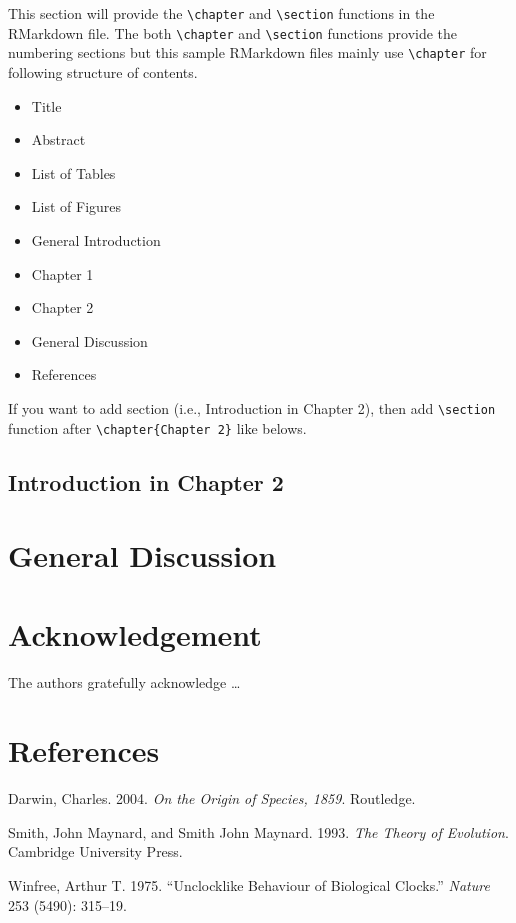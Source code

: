 \documentclass[12pt, a4paper]{report} %
\providecommand{\tightlist}{%
  \setlength{\itemsep}{0pt}\setlength{\parskip}{0pt}}
\newlength{\cslhangindent}
\newenvironment{CSLReferences}[2] %
 {%
  \setlength{\parindent}{0pt}
  \ifodd #1 \everypar{\setlength{\hangindent}{\cslhangindent}}\ignorespaces\fi
  \ifnum #2 > 0
  \setlength{\parskip}{#2\baselineskip}
  \fi
 }%
 {}
\begin{document}
This section will provide the \texttt{\textbackslash{}chapter} and
\texttt{\textbackslash{}section} functions in the RMarkdown file. The
both \texttt{\textbackslash{}chapter} and
\texttt{\textbackslash{}section} functions provide the numbering
sections but this sample RMarkdown files mainly use
\texttt{\textbackslash{}chapter} for following structure of contents.

\begin{itemize}
\tightlist
\item
  Title
\item
  Abstract
\item
  List of Tables
\item
  List of Figures
\item
  General Introduction
\item
  Chapter 1
\item
  Chapter 2
\item
  General Discussion
\item
  References
\end{itemize}

If you want to add section (i.e., Introduction in Chapter 2), then add
\texttt{\textbackslash{}section} function after
\texttt{\textbackslash{}chapter\{Chapter\ 2\}} like belows.

\section{Introduction in Chapter 2}

\chapter*{General Discussion}
\parindent=5.3mm

\chapter*{Acknowledgement}

The authors gratefully acknowledge \ldots{}

\chapter*{References}

\hypertarget{refs}{}
\begin{CSLReferences}{1}{0}
\leavevmode{}%
Darwin, Charles. 2004. \emph{On the Origin of Species, 1859}. Routledge.

\leavevmode{}%
Smith, John Maynard, and Smith John Maynard. 1993. \emph{The Theory of
Evolution}. Cambridge University Press.

\leavevmode{}%
Winfree, Arthur T. 1975. {``Unclocklike Behaviour of Biological
Clocks.''} \emph{Nature} 253 (5490): 315--19.

\end{CSLReferences}



\end{document}
